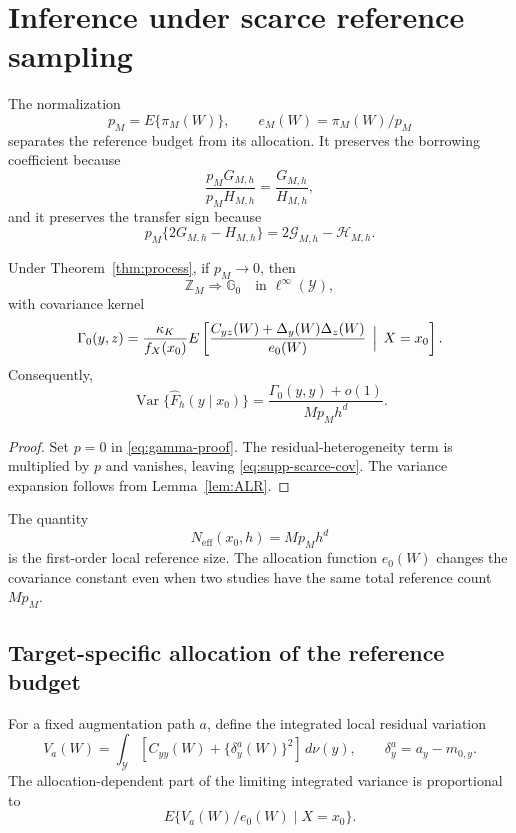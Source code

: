 \section{Inference under scarce reference sampling}
\label{sec:supp-scarcity}

The normalization
\[
p_M=E\{\pi_M(W)\},
\qquad
e_M(W)=\pi_M(W)/p_M
\]
separates the reference budget from its allocation. It preserves the borrowing coefficient because
\[
\frac{p_MG_{M,h}}{p_MH_{M,h}}
=
\frac{G_{M,h}}{H_{M,h}},
\]
and it preserves the transfer sign because
\[
p_M\{2G_{M,h}-H_{M,h}\}
=
2\mathcal G_{M,h}-\mathcal H_{M,h}.
\]

\begin{proposition}
\label{prop:scarce-covariance}
Under Theorem~\ref{thm:process}, if \(p_M\to0\), then
\[
\mathbb Z_M
\Rightarrow
\mathbb G_0
\quad\text{in }\ell^\infty(\mathcal Y),
\]
with covariance kernel
\begin{equation}
\Gamma_0(y,z)
=
\frac{\kappa_K}{f_X(x_0)}
E\left[
\frac{C_{yz}(W)+\Delta_y(W)\Delta_z(W)}{e_0(W)}
\,\Bigm|\,X=x_0
\right].
\label{eq:supp-scarce-cov}
\end{equation}
Consequently,
\[
\operatorname{Var}\{\widehat F_h(y\mid x_0)\}
=
\frac{\Gamma_0(y,y)+o(1)}{Mp_Mh^d}.
\]
\end{proposition}

\begin{proof}
Set \(p=0\) in \eqref{eq:gamma-proof}. The residual-heterogeneity term is multiplied by \(p\) and vanishes, leaving \eqref{eq:supp-scarce-cov}. The variance expansion follows from Lemma~\ref{lem:ALR}.
\end{proof}

The quantity
\[
N_{\mathrm{eff}}(x_0,h)=Mp_Mh^d
\]
is the first-order local reference size. The allocation function \(e_0(W)\) changes the covariance constant even when two studies have the same total reference count \(Mp_M\).

\subsection{Target-specific allocation of the reference budget}

For a fixed augmentation path \(a\), define the integrated local residual variation
\begin{equation}
V_a(W)
=
\int_{\mathcal Y}
\left[
C_{yy}(W)+\{\delta_y^a(W)\}^2
\right]
\,d\nu(y),
\qquad
\delta_y^a=a_y-m_{0,y}.
\label{eq:allocation-residual}
\end{equation}
The allocation-dependent part of the limiting integrated variance is proportional to
\[
E\{V_a(W)/e_0(W)\mid X=x_0\}.
\]

